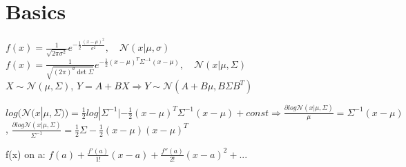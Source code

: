\section{Basics}
$f(x) = \frac{1}{\sqrt{2\pi \sigma^2}} e^{- \frac{1}{2} \frac{(x-\mu)^2}{\sigma^2}},\quad \mathcal{N}(x|\mu, \sigma)$\\
$f(x) = \frac{1}{\sqrt{(2\pi)^d\det\Sigma}} e^{- \frac{1}{2} (x-\mu)^T \Sigma^{-1} (x-\mu)},\quad \mathcal{N}(x|\mu, \Sigma)$\\
$X {\sim} \mathcal{N}(\mu,\Sigma)$, $Y{=}A{+}BX \Rightarrow Y{\sim}\mathcal{N}(A{+}B\mu,B\Sigma B^T)$

$log(\mathcal{N}(x|\mu, \Sigma)) = \frac{1}{2}log|\Sigma^{-1}|- \frac{1}{2}(x - \mu)^T\Sigma^{-1}(x - \mu) + const \Rightarrow \frac{\partial log\mathcal{N}(x|\mu, \Sigma)}{\mu} = \Sigma^{-1}(x - \mu)$, $\frac{\partial log\mathcal{N}(x|\mu, \Sigma)}{\Sigma^{-1}} = \frac{1}{2}\Sigma - \frac{1}{2}(x - \mu)(x - \mu)^T$

f(x) on a: $f(a)+\tfrac{f'(a)}{1!}(x-a) + \tfrac{f''(a)} {2!}(x-a)^2 + ...$ \\

